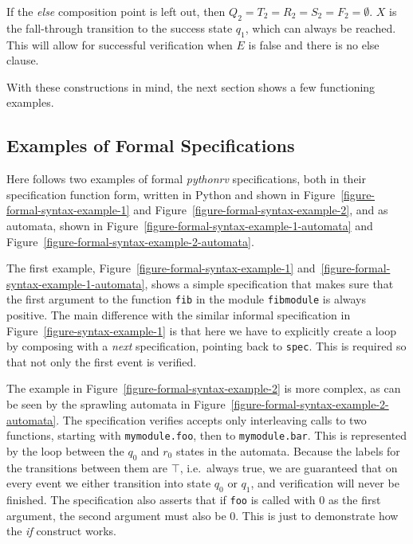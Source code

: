 \documentclass[a4paper,11pt]{kth-mag}
\theoremstyle{definition}
\begin{document}
If the \textit{else} composition point is left out, then $Q_2 = T_2 = R_2 = S_2
= F_2 = \emptyset$. $X$ is the fall-through transition to the success state
$q_1$, which can always be reached. This will allow for successful verification
when $E$ is false and there is no else clause.

With these constructions in mind, the next section shows a few functioning
examples.


\subsection{Examples of Formal Specifications}
\label{section-approach-examples-of-formal-specifications}
\lstset{language=Python,numbers=none}

Here follows two examples of formal \textit{pythonrv} specifications, both in
their specification function form, written in Python and shown in
Figure~\ref{figure-formal-syntax-example-1} and
Figure~\ref{figure-formal-syntax-example-2}, and as automata, shown in
Figure~\ref{figure-formal-syntax-example-1-automata} and
Figure~\ref{figure-formal-syntax-example-2-automata}.

The first example, Figure~\ref{figure-formal-syntax-example-1}
and~\ref{figure-formal-syntax-example-1-automata}, shows a simple specification
that makes sure that the first argument to the function \texttt{fib} in the
module \texttt{fibmodule} is always positive. The main difference with the
similar informal specification in Figure~\ref{figure-syntax-example-1} is that
here we have to explicitly create a loop by composing with a \textit{next}
specification, pointing back to \texttt{spec}. This is required so that not
only the first event is verified.

The example in Figure~\ref{figure-formal-syntax-example-2} is more complex, as
can be seen by the sprawling automata in
Figure~\ref{figure-formal-syntax-example-2-automata}. The specification
verifies accepts only interleaving calls to two functions, starting with
\texttt{mymodule.foo}, then to \texttt{mymodule.bar}. This is represented by
the loop between the $q_0$ and $r_0$ states in the automata. Because the labels
for the transitions between them are $\top$, i.e.\ always true, we are
guaranteed that on every event we either transition into state $q_0$ or $q_1$,
and verification will never be finished. The specification also asserts that if
\texttt{foo} is called with $0$ as the first argument, the second argument must
also be $0$. This is just to demonstrate how the \textit{if} construct works.
\end{document}
